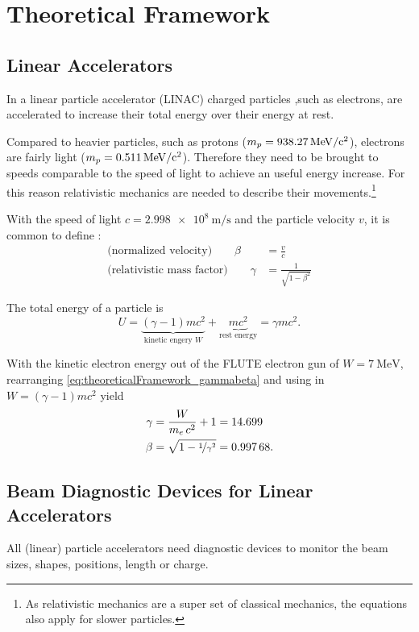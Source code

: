 \chapter{Theoretical Framework}
\section{Linear Accelerators}
In a linear particle accelerator (LINAC) charged particles ,such as electrons, are accelerated to increase their total energy over their energy at rest.

Compared to heavier particles, such as protons ($m_p=\SI{938.27}{\mega\eV\per c\squared}$), electrons are fairly light ($m_p=\SI{0.511}{\mega\eV\per c\squared}$). Therefore they need to be brought to speeds comparable to the speed of light to achieve an useful energy increase. For this reason relativistic mechanics are needed to describe their movements.\footnote{As relativistic mechanics are a super set of classical mechanics, the equations also apply for slower particles.} \cite{Hinterberger1997}

With the speed of light $c=\SI{2.998e8}{\m\per\s}$ and the particle velocity $v$, it is common to define \cite{Wangler2008}:
\begin{align}\label{eq:theoreticalFramework_gammabeta}
\text{(normalized velocity)}\qquad\beta &= \frac{v}{c}\\
\text{(relativistic mass factor)}\qquad\gamma &= \frac{1}{\sqrt{1-\beta^2}}
\end{align}

The total energy of a particle is
\begin{equation}
U=\underbrace{\left(\gamma-1\right)mc^2}_{\text{kinetic engery } W} + \underbrace{mc^2}_{\text{rest energy}} = \gamma mc^2.
\end{equation}

With the kinetic electron energy out of the FLUTE electron gun of $W=\SI{7}{\mega\eV}$, rearranging \autoref{eq:theoreticalFramework_gammabeta} and using in $W=\left(\gamma-1\right)mc^2$ yield
\begin{align}
\gamma &= \frac{W}{m_e\,c^2}+1=\num{14.699}\\
\beta &= \sqrt{1-\nicefrac{1}{\gamma^2}}=\num{0.99768}.
\end{align}


\section{Beam Diagnostic Devices for Linear Accelerators}
All (linear) particle accelerators need diagnostic devices to monitor the beam sizes, shapes, positions, length or charge.

